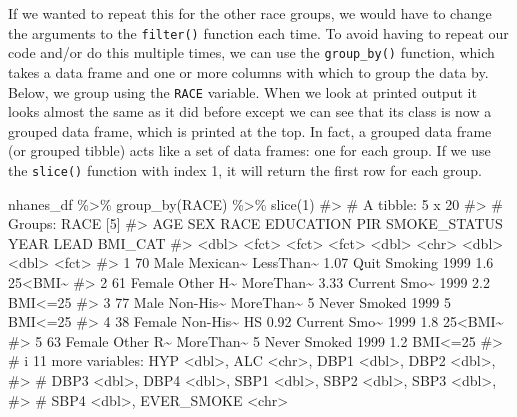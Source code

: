 \documentclass[
  letterpaper,
]{krantz}
\makeatletter
\newenvironment{Shaded}{\begin{snugshade}}{\end{snugshade}}
\newcommand{\CommentTok}[1]{\textcolor[rgb]{0.37,0.37,0.37}{#1}}
\newcommand{\DecValTok}[1]{\textcolor[rgb]{0.68,0.00,0.00}{#1}}
\newcommand{\FunctionTok}[1]{\textcolor[rgb]{0.28,0.35,0.67}{#1}}
\newcommand{\NormalTok}[1]{\textcolor[rgb]{0.00,0.23,0.31}{#1}}
\newcommand{\SpecialCharTok}[1]{\textcolor[rgb]{0.37,0.37,0.37}{#1}}
\newenvironment{kframe}{%
\medskip{}
\setlength{\fboxsep}{.8em}
 \def\at@end@of@kframe{}%
 \ifinner\ifhmode%
  \def\at@end@of@kframe{\end{minipage}}%
  \begin{minipage}{\columnwidth}%
 \fi\fi%
 \def\FrameCommand##1{\hskip\@totalleftmargin \hskip-\fboxsep
 \colorbox{shadecolor}{##1}\hskip-\fboxsep
     \hskip-\linewidth \hskip-\@totalleftmargin \hskip\columnwidth}%
 \MakeFramed {\advance\hsize-\width
   \@totalleftmargin\z@ \linewidth\hsize
   \@setminipage}}%
 {\par\unskip\endMakeFramed%
 \at@end@of@kframe}
\renewenvironment{Shaded}{\begin{kframe}}{\end{kframe}}
\makeatother
\begin{document}
If we wanted to repeat this for the other race groups, we would have to
change the arguments to the \texttt{filter()} function each time. To
avoid having to repeat our code and/or do this multiple times, we can
use the \texttt{group\_by()} function, which takes a data frame and one
or more columns with which to group the data by. Below, we group using
the \texttt{RACE} variable. When we look at printed output it looks
almost the same as it did before except we can see that its class is now
a grouped data frame, which is printed at the top. In fact, a grouped
data frame (or grouped tibble) acts like a set of data frames: one for
each group. If we use the \texttt{slice()} function with index 1, it
will return the first row for each group.

\begin{Shaded}
\begin{Highlighting}[]
\NormalTok{nhanes\_df }\SpecialCharTok{\%\textgreater{}\%} 
  \FunctionTok{group\_by}\NormalTok{(RACE) }\SpecialCharTok{\%\textgreater{}\%}
  \FunctionTok{slice}\NormalTok{(}\DecValTok{1}\NormalTok{)}
\CommentTok{\#\textgreater{} \# A tibble: 5 x 20}
\CommentTok{\#\textgreater{} \# Groups:   RACE [5]}
\CommentTok{\#\textgreater{}     AGE SEX    RACE     EDUCATION   PIR SMOKE\_STATUS  YEAR  LEAD BMI\_CAT}
\CommentTok{\#\textgreater{}   \textless{}dbl\textgreater{} \textless{}fct\textgreater{}  \textless{}fct\textgreater{}    \textless{}fct\textgreater{}     \textless{}dbl\textgreater{} \textless{}chr\textgreater{}        \textless{}dbl\textgreater{} \textless{}dbl\textgreater{} \textless{}fct\textgreater{}  }
\CommentTok{\#\textgreater{} 1    70 Male   Mexican\textasciitilde{} LessThan\textasciitilde{}  1.07 Quit Smoking  1999   1.6 25\textless{}BMI\textasciitilde{}}
\CommentTok{\#\textgreater{} 2    61 Female Other H\textasciitilde{} MoreThan\textasciitilde{}  3.33 Current Smo\textasciitilde{}  1999   2.2 BMI\textless{}=25}
\CommentTok{\#\textgreater{} 3    77 Male   Non{-}His\textasciitilde{} MoreThan\textasciitilde{}  5    Never Smoked  1999   5   BMI\textless{}=25}
\CommentTok{\#\textgreater{} 4    38 Female Non{-}His\textasciitilde{} HS         0.92 Current Smo\textasciitilde{}  1999   1.8 25\textless{}BMI\textasciitilde{}}
\CommentTok{\#\textgreater{} 5    63 Female Other R\textasciitilde{} MoreThan\textasciitilde{}  5    Never Smoked  1999   1.2 BMI\textless{}=25}
\CommentTok{\#\textgreater{} \# i 11 more variables: HYP \textless{}dbl\textgreater{}, ALC \textless{}chr\textgreater{}, DBP1 \textless{}dbl\textgreater{}, DBP2 \textless{}dbl\textgreater{},}
\CommentTok{\#\textgreater{} \#   DBP3 \textless{}dbl\textgreater{}, DBP4 \textless{}dbl\textgreater{}, SBP1 \textless{}dbl\textgreater{}, SBP2 \textless{}dbl\textgreater{}, SBP3 \textless{}dbl\textgreater{},}
\CommentTok{\#\textgreater{} \#   SBP4 \textless{}dbl\textgreater{}, EVER\_SMOKE \textless{}chr\textgreater{}}
\end{Highlighting}
\end{Shaded}
\end{document}
